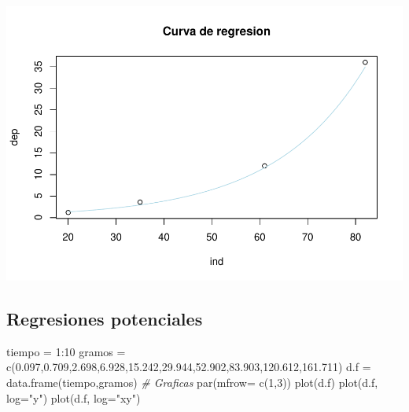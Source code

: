 \documentclass[
]{article}
\newenvironment{Shaded}{\begin{snugshade}}{\end{snugshade}}
\newcommand{\AttributeTok}[1]{\textcolor[rgb]{0.77,0.63,0.00}{#1}}
\newcommand{\CommentTok}[1]{\textcolor[rgb]{0.56,0.35,0.01}{\textit{#1}}}
\newcommand{\DecValTok}[1]{\textcolor[rgb]{0.00,0.00,0.81}{#1}}
\newcommand{\FloatTok}[1]{\textcolor[rgb]{0.00,0.00,0.81}{#1}}
\newcommand{\FunctionTok}[1]{\textcolor[rgb]{0.00,0.00,0.00}{#1}}
\newcommand{\NormalTok}[1]{#1}
\newcommand{\OtherTok}[1]{\textcolor[rgb]{0.56,0.35,0.01}{#1}}
\newcommand{\SpecialCharTok}[1]{\textcolor[rgb]{0.00,0.00,0.00}{#1}}
\newcommand{\StringTok}[1]{\textcolor[rgb]{0.31,0.60,0.02}{#1}}
\begin{document}
\includegraphics{Teoria4_files/figure-latex/Regresion exponencial-1.pdf}

\hypertarget{regresiones-potenciales}{%
\subsection{Regresiones potenciales}\label{regresiones-potenciales}}

\begin{Shaded}
\begin{Highlighting}[]
\NormalTok{tiempo }\OtherTok{=} \DecValTok{1}\SpecialCharTok{:}\DecValTok{10}
\NormalTok{gramos }\OtherTok{=} \FunctionTok{c}\NormalTok{(}\FloatTok{0.097}\NormalTok{,}\FloatTok{0.709}\NormalTok{,}\FloatTok{2.698}\NormalTok{,}\FloatTok{6.928}\NormalTok{,}\FloatTok{15.242}\NormalTok{,}\FloatTok{29.944}\NormalTok{,}\FloatTok{52.902}\NormalTok{,}\FloatTok{83.903}\NormalTok{,}\FloatTok{120.612}\NormalTok{,}\FloatTok{161.711}\NormalTok{)}
\NormalTok{d.f }\OtherTok{=} \FunctionTok{data.frame}\NormalTok{(tiempo,gramos)}
\CommentTok{\# Graficas}
\FunctionTok{par}\NormalTok{(}\AttributeTok{mfrow=} \FunctionTok{c}\NormalTok{(}\DecValTok{1}\NormalTok{,}\DecValTok{3}\NormalTok{))}
\FunctionTok{plot}\NormalTok{(d.f)}
\FunctionTok{plot}\NormalTok{(d.f, }\AttributeTok{log=}\StringTok{"y"}\NormalTok{)}
\FunctionTok{plot}\NormalTok{(d.f, }\AttributeTok{log=}\StringTok{"xy"}\NormalTok{)}
\end{Highlighting}
\end{Shaded}
\end{document}
